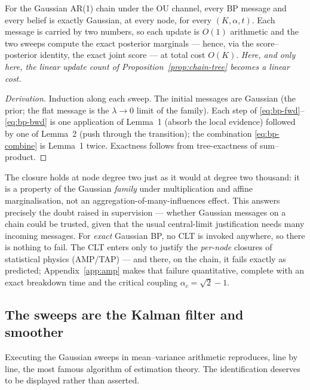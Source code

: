 \begin{theorem}\label{thm:bp-closure}
For the Gaussian AR(1) chain under the OU channel, every BP message and
every belief is exactly Gaussian, at every node, for every
$(K, \alpha, t)$. Each message is carried by two numbers, so each update
is $O(1)$ arithmetic and the two sweeps compute the exact posterior
marginals --- hence, via the score--posterior identity, the exact joint
score --- at total cost $O(K)$. \emph{Here, and only here, the linear
update count of Proposition~\ref{prop:chain-tree} becomes a linear cost.}
\end{theorem}

\begin{proof}[Derivation]
Induction along each sweep. The initial messages are Gaussian (the prior;
the flat message is the $\lambda \to 0$ limit of the family). Each step of
\eqref{eq:bp-fwd}--\eqref{eq:bp-bwd} is one application of Lemma~1 (absorb
the local evidence) followed by one of Lemma~2 (push through the
transition); the combination \eqref{eq:bp-combine} is Lemma~1 twice.
Exactness follows from tree-exactness of sum--product.
\end{proof}

\begin{remark}
\label{rmk:bp-no-clt}
The closure holds at node degree two just as it would at degree two
thousand: it is a property of the Gaussian \emph{family} under
multiplication and affine marginalisation, not an
aggregation-of-many-influences effect. This answers precisely the doubt
raised in supervision --- whether Gaussian messages on a chain could be
trusted, given that the usual central-limit justification needs many
incoming messages. For \emph{exact} Gaussian BP, no CLT is invoked
anywhere, so there is nothing to fail. The CLT enters only to justify the
\emph{per-node} closures of statistical physics (AMP/TAP) --- and there,
on the chain, it fails exactly as predicted; Appendix~\ref{app:amp} makes
that failure quantitative, complete with an exact breakdown time and the
critical coupling $\alpha_c = \sqrt{2} - 1$.
\end{remark}

\subsection{The sweeps are the Kalman filter and smoother}
\label{sec:bp-kalman}

Executing the Gaussian sweeps in mean--variance arithmetic reproduces,
line by line, the most famous algorithm of estimation theory. The
identification deserves to be displayed rather than asserted.

